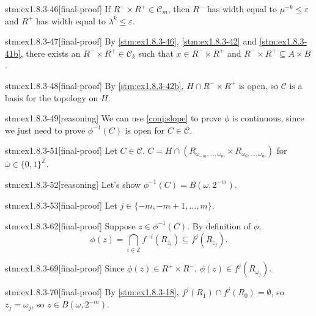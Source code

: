 \begin{stm}{stm:ex1.8.3-46}[final-proof]
If $R^- \times R^+ \in \mathcal{C}_m$, then $R^-$ has width equal to $\mu^{-k} \leq \varepsilon$ and $R^+$ has width equal to $\lambda^k \leq \varepsilon$.
\end{stm}

\begin{stm}{stm:ex1.8.3-47}[final-proof]
By \ref{stm:ex1.8.3-46}, \ref{stm:ex1.8.3-42} and \ref{stm:ex1.8.3-41b}, there exists an $R^- \times R^+ \in \mathcal{C}_k$ such that $x \in R^- \times R^+$ and $R^- \times R^+ \subseteq A \times B$.
\end{stm}

\begin{stm}{stm:ex1.8.3-48}[final-proof]
By \ref{stm:ex1.8.3-42b}, $H \cap R^- \times R^+$ is open, so $\mathcal{C}$ is a basis for the topology on $H$.
\end{stm}

\begin{stm}{stm:ex1.8.3-49}[reasoning]
We can use \ref{conj:slope} to prove $\phi$ is continuous, since we just need to prove $\phi^{-1}(C)$ is open for $C \in \mathcal{C}$.
\end{stm}

\begin{stm}{stm:ex1.8.3-51}[final-proof]
Let $C \in \mathcal{C}$. $C = H \cap (R_{\omega_{-m}, \ldots, \omega_m} \times R_{\omega_0, \ldots, \omega_m})$ for $\omega \in \{0,1\}^{\mathbb{Z}}$.
\end{stm}

\begin{stm}{stm:ex1.8.3-52}[reasoning]
Let's show $\phi^{-1}(C) = B(\omega, 2^{-m})$.
\end{stm}

\begin{stm}{stm:ex1.8.3-53}[final-proof]
Let $j \in \{-m, -m+1, \ldots, m\}$.
\end{stm}

\begin{stm}{stm:ex1.8.3-62}[final-proof]
Suppose $z \in \phi^{-1}(C)$. By definition of $\phi$,
\[
\phi(z) = \bigcap_{i \in \mathbb{Z}} f^{-i}(R_{z_i}) \subseteq f^j(R_{z_j}).
\]
\end{stm}

\begin{stm}{stm:ex1.8.3-69}[final-proof]
Since $\phi(z) \in R^+ \times R^-$, $\phi(z) \in f^j(R_{\omega_j})$. 
\end{stm}

\begin{stm}{stm:ex1.8.3-70}[final-proof]
By \ref{stm:ex1.8.3-18}, $f^j(R_1) \cap f^j(R_0) = \emptyset$, so $z_j = \omega_j$, so $z \in B(\omega, 2^{-m})$.
\end{stm}

